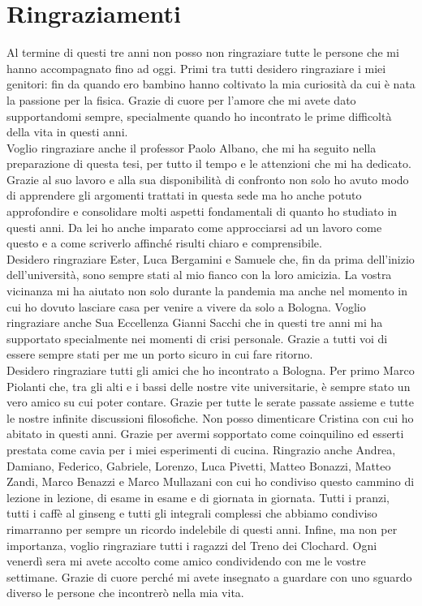 
\chapter*{Ringraziamenti}
Al termine di questi tre anni non posso non ringraziare tutte le persone che mi hanno accompagnato fino ad oggi. Primi tra tutti desidero ringraziare i miei genitori: fin da quando ero bambino hanno coltivato la mia curiosità da cui è nata la passione per la fisica. Grazie di cuore per l'amore che mi avete dato supportandomi sempre, specialmente quando ho incontrato le prime difficoltà della vita in questi anni.\\Voglio ringraziare anche il professor Paolo Albano, che mi ha seguito nella preparazione di questa tesi, per tutto il tempo e le attenzioni che mi ha dedicato. Grazie al suo lavoro e alla sua disponibilità di confronto non solo ho avuto modo di apprendere gli argomenti trattati in questa sede ma ho anche potuto approfondire e consolidare molti aspetti fondamentali di quanto ho studiato in questi anni. Da lei ho anche imparato come approcciarsi ad un lavoro come questo e a come scriverlo affinché risulti chiaro e comprensibile.\\ Desidero ringraziare Ester, Luca Bergamini e Samuele che, fin da prima dell'inizio dell'università, sono sempre stati al mio fianco con la loro amicizia. La vostra vicinanza mi ha aiutato non solo durante la pandemia ma anche nel momento in cui ho dovuto lasciare casa per venire a vivere da solo a Bologna. Voglio ringraziare anche Sua Eccellenza Gianni Sacchi che in questi tre anni mi ha supportato specialmente nei momenti di crisi personale.  Grazie a tutti voi di essere sempre stati per me un porto sicuro in cui fare ritorno.\\Desidero ringraziare tutti gli amici che ho incontrato a Bologna. Per primo Marco Piolanti che, tra gli alti e i bassi delle nostre vite universitarie, è sempre stato un vero amico su cui poter contare. Grazie per tutte le serate passate assieme e tutte le nostre infinite discussioni filosofiche. Non posso dimenticare Cristina con cui ho abitato in questi anni. Grazie per avermi sopportato come coinquilino ed esserti prestata come cavia per i miei esperimenti di cucina. Ringrazio anche Andrea, Damiano, Federico, Gabriele, Lorenzo, Luca Pivetti, Matteo Bonazzi, Matteo Zandi, Marco Benazzi e Marco Mullazani con cui ho condiviso questo cammino di lezione in lezione, di esame in esame e di giornata in giornata. Tutti i pranzi, tutti i caffè al ginseng e tutti gli integrali complessi che abbiamo condiviso rimarranno per sempre un ricordo indelebile di questi anni. Infine, ma non per importanza, voglio ringraziare tutti i ragazzi del Treno dei Clochard. Ogni venerdì sera mi avete accolto come amico condividendo con me le vostre settimane. Grazie di cuore perché mi avete insegnato a guardare con uno sguardo diverso le persone che incontrerò nella mia vita.
